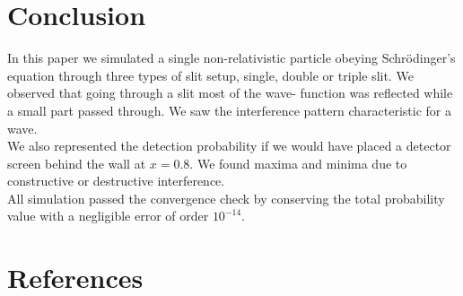 \documentclass[english,notitlepage,reprint,nofootinbib]{revtex4-2}  %
\begin{document}
	\section{Conclusion}\label{sec:conclusion}
	
	In this paper we simulated a single non-relativistic particle obeying 
	Schrödinger's equation through three types of slit setup, single, double
	or triple slit. We observed that going through a slit most of the wave-
	function was reflected while a small part passed through. We saw the 
	interference pattern characteristic for a wave. \\
	
	We also represented the detection probability if we would have placed 
	a detector screen behind the wall at $x=0.8$. We found maxima and 
	minima due to constructive or destructive interference. \\
	
	All simulation passed the convergence check by conserving the total 
	probability value with a negligible error of order  $10^{-14}$. \\
	
	
	
	\onecolumngrid
	\section*{References}
	
	
	
\end{document}
